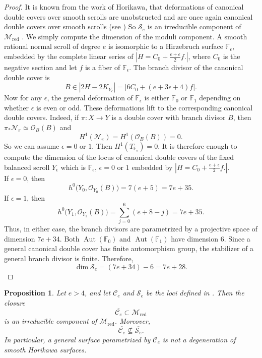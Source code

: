 \documentclass[11pt,twoside]{amsart}
\theoremstyle{plain}
\numberwithin{equation}{section}
\newtheorem{proposition}[theorem]{Proposition}
\theoremstyle{definition}
\begin{document}
\begin{proof}
It is known from the work of Horikawa, that deformations of canonical double covers over smooth scrolls are unobstructed and are once again canonical double covers over smooth scrolls (see \cite{Hor76I,Hor76II}) So $\mathcal{S}_e$ is an irreducible component of $\mathcal{M}_{\operatorname{red}}$ . We simply compute the dimension of the moduli component.
A smooth rational normal scroll of degree $e$ is isomorphic to a Hirzebruch surface $\mathbb F_\epsilon$, embedded by the complete linear series of $|
H=C_0+\frac{e+\epsilon}{2}f.
|$, where $C_0$ is the negative section and let $f$ is a fiber of $\mathbb F_\epsilon$.
The branch divisor of the canonical double cover is
$$
B\in|2H-2K_{Y_\epsilon}| = \left|6C_0+(e+3\epsilon+4)f\right|.
$$
Now for any $\epsilon$, the general deformation of $\mathbb F_{\epsilon}$ is either $\mathbb F_0$ or $\mathbb F_1$ depending on whether $\epsilon$ is even or odd.
These deformations lift to the corresponding canonical double covers. Indeed, if $\pi:X\to Y$ is a double cover with branch divisor $B$, then $\pi_*\mathcal N_\pi\simeq\mathcal O_B(B)$ and
$$
H^1(\mathcal N_\pi)=H^1(\mathcal O_B(B))=0.
$$
So we can assume $\epsilon = 0$ or $1$. Then $H^1(T_{\mathbb F_\epsilon})=0$. It is therefore enough to compute the dimension of the locus of canonical double covers of the fixed balanced scroll $Y_\epsilon$ which is $\mathbb F_{\epsilon}$, $\epsilon = 0$ or $1$  embedded by $|
H=C_0+\frac{e+\epsilon}{2}f.
|$. \\
If $\epsilon=0$, then
$$
h^0\bigl(Y_0,\mathcal O_{Y_0}(B)\bigr) = 7(e+5)
= 7e+35.
$$
If $\epsilon=1$, then
$$
h^0\bigl(Y_1,\mathcal O_{Y_1}(B)\bigr)
= \sum_{j=0}^{6}(e+8-j)
= 7e+35.
$$
Thus, in either case, the branch divisors are parametrized by a projective space of dimension $7e+34$. Both $\operatorname{Aut}(\mathbb F_0)$ and $\operatorname{Aut}(\mathbb F_1)$ have dimension $6$. Since a general canonical double cover has finite automorphism group, the stabilizer of a general branch divisor is finite. Therefore,
$$
\dim\mathcal S_e
= (7e+34)-6 = 7e+28.
$$

\end{proof}

\begin{proposition}\label{prop:cone-cover-component}
Let $e>4$, and let $\mathcal C_e$ and $\mathcal S_e$ be the loci defined in
.
Then the closure
$$
\overline{\mathcal C_e}\subset\mathcal M_{\mathrm{red}}
$$
is an irreducible component of $\mathcal M_{\mathrm{red}}$. Moreover,
$$
\overline{\mathcal C_e}\not\subseteq\overline{\mathcal S_e}.
$$
In particular, a general surface parametrized by $\mathcal C_e$ is not a
degeneration of smooth Horikawa surfaces.
\end{proposition}
\end{document}

